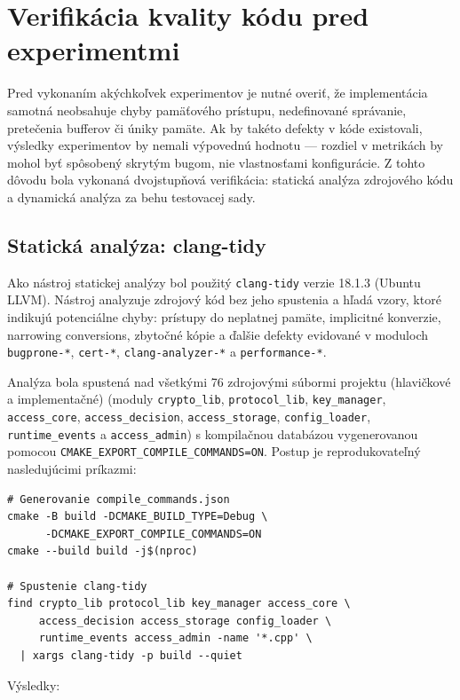 \documentclass[journal,a4paper,onecolumn]{IEEEtran}
\begin{document}
\section{Verifikácia kvality kódu pred experimentmi}

Pred vykonaním akýchkoľvek experimentov je nutné overiť, že implementácia samotná neobsahuje chyby pamäťového prístupu, nedefinované správanie, pretečenia bufferov či úniky pamäte. Ak by takéto defekty v kóde existovali, výsledky experimentov by nemali výpovednú hodnotu --- rozdiel v metrikách by mohol byť spôsobený skrytým bugom, nie vlastnosťami konfigurácie. Z tohto dôvodu bola vykonaná dvojstupňová verifikácia: statická analýza zdrojového kódu a dynamická analýza za behu testovacej sady.

\subsection{Statická analýza: clang-tidy}

Ako nástroj statickej analýzy bol použitý \texttt{clang-tidy}\cite{ClangTidy} verzie 18.1.3 (Ubuntu LLVM). Nástroj analyzuje zdrojový kód bez jeho spustenia a hľadá vzory, ktoré indikujú potenciálne chyby: prístupy do neplatnej pamäte, implicitné konverzie, narrowing conversions, zbytočné kópie a ďalšie defekty evidované v moduloch \texttt{bugprone-*}, \texttt{cert-*}, \texttt{clang-analyzer-*} a \texttt{performance-*}.

Analýza bola spustená nad všetkými 76 zdrojovými súbormi projektu (hlavičkové a implementačné) (moduly \texttt{crypto\_lib}, \texttt{protocol\_lib}, \texttt{key\_manager}, \texttt{access\_core}, \texttt{access\_decision}, \texttt{access\_storage}, \texttt{config\_loader}, \texttt{runtime\_events} a \texttt{access\_admin}) s kompilačnou databázou vygenerovanou pomocou \texttt{CMAKE\_EXPORT\_COMPILE\_COMMANDS=ON}. Postup je reprodukovateľný nasledujúcimi príkazmi:

\begin{verbatim}
# Generovanie compile_commands.json
cmake -B build -DCMAKE_BUILD_TYPE=Debug \
      -DCMAKE_EXPORT_COMPILE_COMMANDS=ON
cmake --build build -j$(nproc)

# Spustenie clang-tidy
find crypto_lib protocol_lib key_manager access_core \
     access_decision access_storage config_loader \
     runtime_events access_admin -name '*.cpp' \
  | xargs clang-tidy -p build --quiet
\end{verbatim}

Výsledky:
\end{document}
